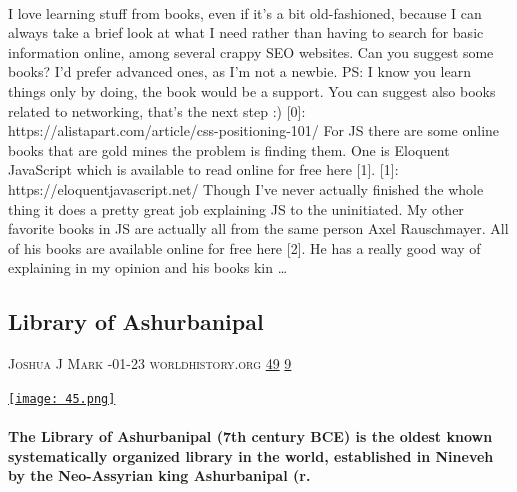 \documentclass[10pt,a4paper]{article}
\begin{document}
\begin{multicols}{2}
\paragraph{}
 I love learning stuff from books, even if it's a bit old-fashioned, because I can always take a brief look at what I need rather than having to search for basic information online, among several crappy SEO websites.
Can you suggest some books? I'd prefer advanced ones, as I'm not a newbie.
PS: I know you learn things only by doing, the book would be a support. You can suggest also books related to networking, that's the next step :)
[0]: https://alistapart.com/article/css-positioning-101/
For JS there are some online books that are gold mines the problem is finding them. One is Eloquent JavaScript which is available to read online for free here [1].
[1]: https://eloquentjavascript.net/
Though I've never actually finished the whole thing it does a pretty great job explaining JS to the uninitiated.
My other favorite books in JS are actually all from the same person Axel Rauschmayer. All of his books are available online for free here [2]. He has a really good way of explaining in my opinion and his books kin
\dots\par
\noindent\begin{minipage}{\linewidth}
\medskip
\subsection{Library of Ashurbanipal}
\textsc{\footnotesize
{\scriptsize\faUser}\space 
Joshua J Mark 
{\scriptsize\faCalendar}-01-23 
{\scriptsize\faGlobe}\space 
worldhistory.org 
{\scriptsize\faThumbsOUp}\space 
\href{http://news.ycombinator.com/item?id=37333299\&utm\_term=comment}{49} 
{\scriptsize\faComments}\space 
\href{http://news.ycombinator.com/item?id=37333299\&utm\_term=comment}{9} 
}
\par\medskip\noindent
\href{https://www.worldhistory.org/Library\_of\_Ashurbanipal/?utm\_source=hackernewsletter\&utm\_medium=email\&utm\_term=books}{
    \texttt{[image: 45.png]}
}
\end{minipage}
\paragraph{}
\textbf{The Library of Ashurbanipal (7th century BCE) is the oldest known systematically organized library in the world, established in Nineveh by the Neo-Assyrian king Ashurbanipal (r.}

\end{multicols}
\end{document}
